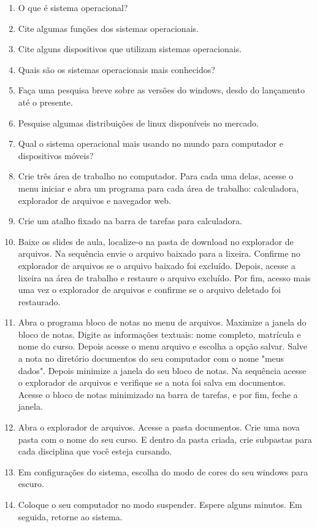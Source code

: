 \documentclass[11pt]{article}
\begin{document}
	\begin{enumerate}
		\item O que é sistema operacional?
		\item Cite algumas funções dos sistemas operacionais.
		\item Cite alguns dispositivos que utilizam sistemas operacionais.
		\item Quais são os sistemas operacionais mais conhecidos?
		\item Faça uma pesquisa breve sobre as versões do windows, desdo do lançamento até o presente.
		\item Pesquise algumas distribuições de linux disponíveis no mercado. 
		\item Qual o sistema operacional mais usando no mundo para computador e dispositivos móveis?
		\item Crie três área de trabalho no computador. Para cada uma delas, acesse o menu iniciar e abra um programa para cada área de trabalho: calculadora, explorador de arquivos e navegador web.
		\item Crie um atalho fixado na barra de tarefas para calculadora.
		\item Baixe os slides de aula, localize-o na pasta de download no explorador de arquivos. Na sequência envie o arquivo baixado para a lixeira. Confirme no explorador de arquivos se o arquivo baixado foi excluído. Depois, acesse a lixeira na área de trabalho e restaure o arquivo excluído. Por fim, acesso mais uma vez o explorador de arquivos e confirme se o arquivo deletado foi restaurado.
		\item Abra o programa bloco de notas no menu de arquivos. Maximize a janela do bloco de notas. Digite as informações textuais: nome completo, matrícula e nome do curso. Depois acesse o menu arquivo e escolha a opção salvar. Salve a nota no diretório documentos do seu computador com o nome "meus dados". Depois minimize a janela do seu bloco de notas. Na sequência acesse o explorador de arquivos e verifique se a nota foi salva em documentos. Acesse o bloco de notas minimizado na barra de tarefas, e por fim, feche a janela.
		\item Abra o explorador de arquivos. Acesse a pasta documentos. Crie uma nova pasta com o nome do seu curso. E dentro da pasta criada, crie subpastas para cada disciplina que você esteja cursando.
		\item Em configurações do sistema, escolha do modo de cores do seu windows para escuro.
		\item Coloque o seu computador no modo suspender. Espere alguns minutos. Em seguida, retorne ao sistema.

\end{enumerate}
\end{document}
